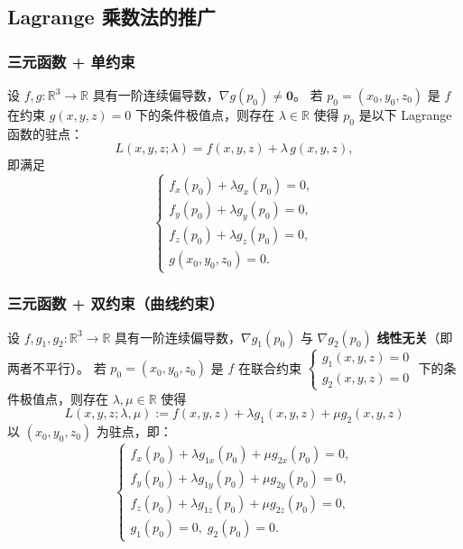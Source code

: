 \documentclass[lang=cn,11pt]{elegantbook}
\begin{document}
\subsection{Lagrange 乘数法的推广}

\subsubsection*{三元函数 + 单约束}

\begin{proposition} \label{prop:lagrange-3d-one-constraint}
设 $f,g:\mathbb R^3\to\mathbb R$ 具有一阶连续偏导数，$\nabla g(p_0) \neq \boldsymbol{0}$。
若 $p_0=(x_0,y_0,z_0)$ 是 $f$ 在约束 $g(x,y,z)=0$ 下的条件极值点，则存在 $\lambda\in\mathbb R$ 使得 $p_0$ 是以下 Lagrange 函数的驻点：
\[
L(x,y,z;\lambda)=f(x,y,z)+\lambda\,g(x,y,z),
\]
即满足
\[
\begin{cases}
f_x(p_0)+\lambda g_x(p_0)=0,\\
f_y(p_0)+\lambda g_y(p_0)=0,\\
f_z(p_0)+\lambda g_z(p_0)=0,\\
g(x_0,y_0,z_0)=0.
\end{cases}
\]
\end{proposition}

\subsubsection*{三元函数 + 双约束（曲线约束）}

\begin{proposition} \label{prop:lagrange-3d-two-constraints}
设 $f,g_1,g_2:\mathbb R^3\to\mathbb R$ 具有一阶连续偏导数，$\nabla g_1(p_0)$ 与 $\nabla g_2(p_0)$ \textbf{线性无关}（即两者不平行）。
若 $p_0=(x_0,y_0,z_0)$ 是 $f$ 在联合约束
$\begin{cases}g_1(x,y,z)=0\\g_2(x,y,z)=0\end{cases}$
下的条件极值点，则存在 $\lambda,\mu\in\mathbb R$ 使得
\[
L(x,y,z;\lambda,\mu):=f(x,y,z)+\lambda g_1(x,y,z)+\mu g_2(x,y,z)
\]
以 $(x_0,y_0,z_0)$ 为驻点，即：
\[
\begin{cases}
f_x(p_0)+\lambda g_{1x}(p_0)+\mu g_{2x}(p_0)=0,\\
f_y(p_0)+\lambda g_{1y}(p_0)+\mu g_{2y}(p_0)=0,\\
f_z(p_0)+\lambda g_{1z}(p_0)+\mu g_{2z}(p_0)=0,\\
g_1(p_0)=0,\;g_2(p_0)=0.
\end{cases}
\]
\end{proposition}
\end{document}
